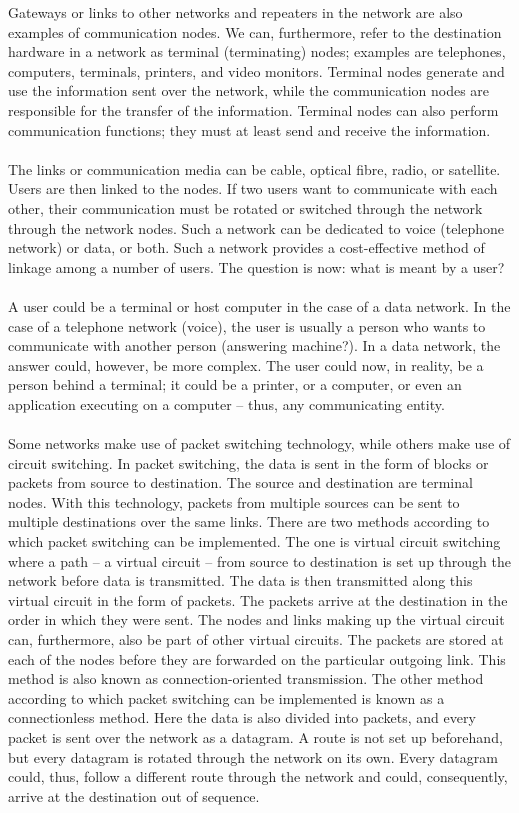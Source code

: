 \documentclass[a4paper, 12pt, titlepage]{report}
\begin{document}
Gateways or links to other networks and repeaters in the network are also examples of communication nodes. We can, furthermore, refer to the destination hardware in a network as terminal (terminating) nodes; examples are telephones, computers, terminals, printers, and video monitors. Terminal nodes generate and use the information sent over the network, while the communication nodes are responsible for the transfer of the information. Terminal nodes can also perform communication functions; they must at least send and receive the information.\\\\
The links or communication media can be cable, optical fibre, radio, or satellite. Users are then linked to the nodes. If two users want to communicate with each other, their communication must be rotated or switched through the network through the network nodes. Such a network can be dedicated to voice (telephone network) or data, or both. Such a network provides a cost-effective method of linkage among a number of users. The question is now: what is meant by a user?\\\\
A user could be a terminal or host computer in the case of a data network. In the case of a telephone network (voice), the user is usually a person who wants to communicate with another person (answering machine?). In a data network, the answer could, however, be more complex. The user could now, in reality, be a person behind a terminal; it could be a printer, or a computer, or even an application executing on a computer – thus, any communicating entity.\\\\
Some networks make use of packet switching technology, while others make use of circuit switching. In packet switching, the data is sent in the form of blocks or packets from source to destination. The source and destination are terminal nodes. With this technology, packets from multiple sources can be sent to multiple destinations over the same links. There are two methods according to which packet switching can be implemented. The one is virtual circuit switching where a path – a virtual circuit – from source to destination is set up through the network before data is transmitted. The data is then transmitted along this virtual circuit in the form of packets. The packets arrive at the destination in the order in which they were sent. The nodes and links making up the virtual circuit can, furthermore, also be part of other virtual circuits. The packets are stored at each of the nodes before they are forwarded on the particular outgoing link. This method is also known as connection-oriented transmission. The other method according to which packet switching can be implemented is known as a connectionless method. Here the data is also divided into packets, and every packet is sent over the network as a datagram. A route is not set up beforehand, but every datagram is rotated through the network on its own. Every datagram could, thus, follow a different route through the network and could, consequently, arrive at the destination out of sequence.\\\\
\end{document}
